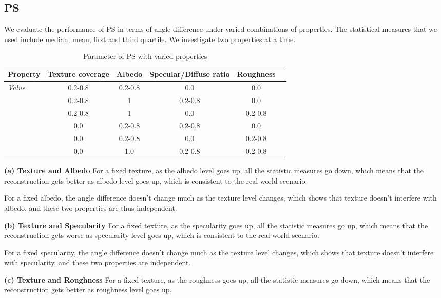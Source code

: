 \subsection{PS}
We evaluate the performance of PS in terms of angle difference under varied combinations of properties. The statistical measures that we used include median, mean, first and third quartile. We investigate two properties at a time.

\begin{table}[h]
  \centering
  \begin{tabular}{l*{5}{c}}
  \hline
  \textbf{Property} & Texture coverage & Albedo & Specular/Diffuse ratio & Roughness\\
  \hline
  \textit{Value} & 0.2-0.8 & 0.2-0.8 & 0.0 & 0.0\\
                 & 0.2-0.8 & 1 & 0.2-0.8 & 0.0\\
                 & 0.2-0.8 & 1 & 0.0 & 0.2-0.8\\
                 & 0.0 & 0.2-0.8 & 0.2-0.8 & 0.0\\
                 & 0.0 & 0.2-0.8 & 0.0 & 0.2-0.8\\
                 & 0.0 & 1.0 & 0.2-0.8 & 0.2-0.8\\
  \hline
  \end{tabular}
  \caption{Parameter of PS with varied properties}
\end{table}

\textbf{(a) Texture and Albedo} 
For a fixed texture, as the albedo level goes up, all the statistic measures go down, which means that the reconstruction gets better as albedo level goes up, which is consistent to the real-world scenario.

For a fixed albedo, the angle difference doesn't change much as the texture level changes, which shows that texture doesn't interfere with albedo, and these two properties are thus independent.

\textbf{(b) Texture and Specularity} 
For a fixed texture, as the specularity goes up, all the statistic measures go up, which means that the reconstruction gets worse as specularity level goes up, which is consistent to the real-world scenario.

For a fixed specularity, the angle difference doesn't change much as the texture level changes, which shows that texture doesn't interfere with specularity, and these two properties are independent.

\textbf{(c) Texture and Roughness} 
For a fixed texture, as the roughness goes up, all the statistic measures go down, which means that the reconstruction gets better as roughness level goes up.

